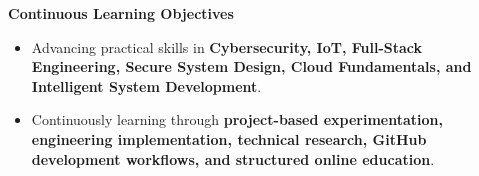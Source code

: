 \documentclass[a4paper,11pt]{article}
\begin{document}
\vspace{4pt}

\textbf{Continuous Learning Objectives}
\begin{itemize}

    \item Advancing practical skills in \textbf{Cybersecurity, IoT, Full-Stack Engineering, Secure System Design, Cloud Fundamentals, and Intelligent System Development}.

    \item Continuously learning through \textbf{project-based experimentation, engineering implementation, technical research, GitHub development workflows, and structured online education}.

\end{itemize}








\end{document}
